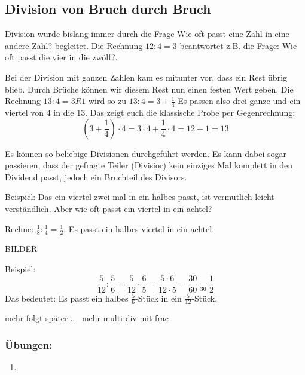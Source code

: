 \subsection{Division von Bruch durch Bruch}\vspace{-1em}
Division wurde bislang immer durch die Frage \glqq{}Wie oft passt eine Zahl in eine andere Zahl?\grqq{} begleitet. 
Die Rechnung $12:4=3$ beantwortet z.B. die Frage: \glqq{}Wie oft passt die vier in die zwölf?\grqq{}.

Bei der Division mit ganzen Zahlen kam es mitunter vor, dass ein Rest übrig blieb. Durch Brüche können wir diesem Rest nun einen festen Wert geben. Die Rechnung 
$	13:4 = 3 R 1 $ wird so zu $13:4= 3+\frac{1}{4}$
Es passen also drei ganze und ein viertel von $4$ in die $13$. Das zeigt euch die klassische Probe per Gegenrechnung:
\begin{equation*}
	\left(3+\frac{1}{4}\right)\cdot 4 = 3\cdot 4 + \frac{1}{4}\cdot 4 = 12 + 1 = 13
\end{equation*}

Es können so beliebige Divisionen durchgeführt werden. Es kann dabei sogar passieren, dass der gefragte Teiler (Divisior) kein einziges Mal komplett in den Dividend passt, jedoch ein Bruchteil des Divisors.

Beispiel: Das ein viertel zwei mal in ein halbes passt, ist vermutlich leicht verständlich. Aber wie oft passt ein viertel in ein achtel?

Rechne: $\frac{1}{8}:\frac{1}{4}=\frac{1}{2}$. Es passt ein halbes viertel in ein achtel.

BILDER


Beispiel:
\begin{equation*}
	\frac{5}{12}:\frac{5}{6}= \frac{5}{12}\cdot \frac{6}{5}=\frac{5\cdot 6}{12\cdot 5}= \frac{30}{60}\underset{30}{=}\frac{1}{2}
\end{equation*}
Das bedeutet: Es passt ein halbes $\frac{5}{6}$-Stück in ein $\frac{5}{12}$-Stück.

mehr folgt später... \ {mehr multi div mit frac}

\subsubsection*{Übungen:}\vspace{-1em}
\begin{enumerate}[label=\alph*)]
	\item {}
\end{enumerate}